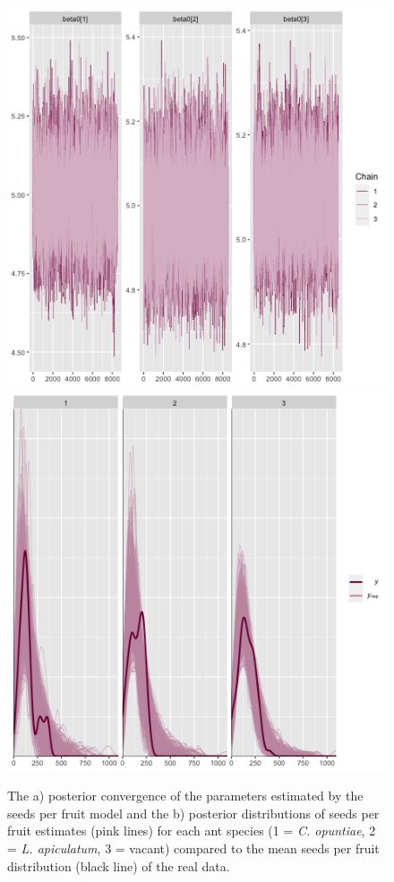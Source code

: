 \documentclass[11pt]{article}
\begin{document}
\begin{figure}
	\includegraphics[width = 0.45\linewidth]{Figures/seed_conv.png}
	\includegraphics[width=0.45\linewidth]{Figures/seed_ant_post.png}
	\caption{The a) posterior convergence of the parameters estimated by the seeds per fruit model and the b) posterior distributions of seeds per fruit estimates (pink lines) for each ant species (1 = \textit{C. opuntiae}, 2 = \textit{L. apiculatum}, 3 = vacant) compared to the mean seeds per fruit distribution (black line) of the real data.}
	\label{fig:seed_post}
\end{figure}
\end{document}
